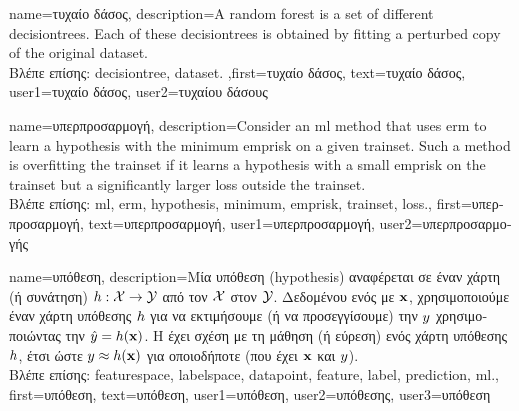 {name={\foreignlanguage{greek}{τυχαίο δάσος}},
	description={A random forest is a set of different \gls{decisiontree}s. 
		Each of these \gls{decisiontree}s is obtained by fitting a perturbed copy of 
		the original \gls{dataset}.\\
		\foreignlanguage{greek}{Βλέπε επίσης:} \gls{decisiontree}, \gls{dataset}.
		},first={\foreignlanguage{greek}{τυχαίο δάσος}}, 
		text={\foreignlanguage{greek}{τυχαίο δάσος}},
		user1={\foreignlanguage{greek}{τυχαίο δάσος}}, %
		user2={\foreignlanguage{greek}{τυχαίου δάσους}} %
}

{name={\foreignlanguage{greek}{υπερπροσαρμογή}},
	description={Consider an 
		\gls{ml} method that uses \gls{erm} to learn a \gls{hypothesis} with the \gls{minimum} \gls{emprisk} on 
		a given \gls{trainset}. Such a method is overfitting the \gls{trainset} if it learns 
		a \gls{hypothesis} with a small \gls{emprisk} on the \gls{trainset} but a significantly larger \gls{loss} outside the \gls{trainset}.\\
		\foreignlanguage{greek}{Βλέπε επίσης:} \gls{ml}, \gls{erm}, \gls{hypothesis}, \gls{minimum}, \gls{emprisk}, \gls{trainset}, \gls{loss}.},
		first={\foreignlanguage{greek}{υπερπροσαρμογή}},
		text={\foreignlanguage{greek}{υπερπροσαρμογή}},
		user1={\foreignlanguage{greek}{υπερπροσαρμογή}}, %
    		user2={\foreignlanguage{greek}{υπερπροσαρμογής}} %
}

{name={\foreignlanguage{greek}{υπόθεση}},
	description={\foreignlanguage{greek}{Μία υπόθεση} (hypothesis) 
		\foreignlanguage{greek}{αναφέρεται σε έναν χάρτη (ή συνάτηση) $h: \mathcal{X} \rightarrow \mathcal{Y}$ από τον}  
		 $\mathcal{X}$ \foreignlanguage{greek}{στον}  $\mathcal{Y}$. 
		\foreignlanguage{greek}{Δεδομένου ενός}  \foreignlanguage{greek}{με}  ${\bf x}$, 
		\foreignlanguage{greek}{χρησιμοποι\-ού\-με έναν χάρτη υπόθεσης $h$
		για να εκτιμήσουμε (ή να προσεγγίσουμε) την}  $y$ \foreignlanguage{greek}{χρησιμοποιώντας την} 
		 $\hat{y} = h({\bf x})$. \foreignlanguage{greek}{Η}  
		\foreignlanguage{greek}{έχει σχέση με τη μάθηση (ή εύρεση) ενός χάρτη υπόθεσης 
		$h$, έτσι ώστε $y \approx h({\bf x})$ 
		για οποιοδήποτε}  \foreignlanguage{greek}{(που έχει}  ${\bf x}$ 
		\foreignlanguage{greek}{και}  $y$).\\
		\foreignlanguage{greek}{Βλέπε επίσης:} \gls{featurespace}, \gls{labelspace}, \gls{datapoint}, \gls{feature}, \gls{label}, \gls{prediction}, \gls{ml}.},
		first={\foreignlanguage{greek}{υπόθεση}},
		text={\foreignlanguage{greek}{υπόθεση}},
		user1={\foreignlanguage{greek}{υπόθεση}}, %
		user2={\foreignlanguage{greek}{υπόθεσης}}, %
		user3={\foreignlanguage{greek}{υπόθεση}} %
}

